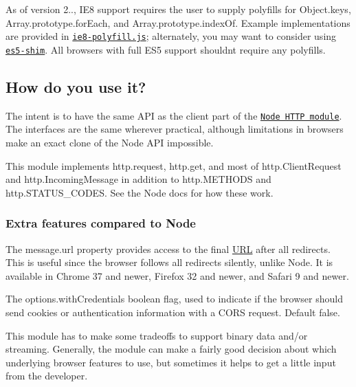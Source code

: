 As of version 2.., I\+E8 support requires the user to supply polyfills for {\ttfamily Object.\+keys}, {\ttfamily Array.\+prototype.\+for\+Each}, and {\ttfamily Array.\+prototype.\+index\+Of}. Example implementations are provided in \href{ie8-polyfill.js}{\tt ie8-\/polyfill.\+js}; alternately, you may want to consider using \href{https://github.com/es-shims/es5-shim}{\tt es5-\/shim}. All browsers with full E\+S5 support shouldn\textquotesingle{}t require any polyfills.

\subsection*{How do you use it?}

The intent is to have the same A\+PI as the client part of the \href{https://nodejs.org/api/http.html}{\tt Node H\+T\+TP module}. The interfaces are the same wherever practical, although limitations in browsers make an exact clone of the Node A\+PI impossible.

This module implements {\ttfamily http.\+request}, {\ttfamily http.\+get}, and most of {\ttfamily http.\+Client\+Request} and {\ttfamily http.\+Incoming\+Message} in addition to {\ttfamily http.\+M\+E\+T\+H\+O\+DS} and {\ttfamily http.\+S\+T\+A\+T\+U\+S\+\_\+\+C\+O\+D\+ES}. See the Node docs for how these work.

\subsubsection*{Extra features compared to Node}


\begin{DoxyItemize}
\item The {\ttfamily message.\+url} property provides access to the final \mbox{\hyperlink{namespace_u_r_l}{U\+RL}} after all redirects. This is useful since the browser follows all redirects silently, unlike Node. It is available in Chrome 37 and newer, Firefox 32 and newer, and Safari 9 and newer.
\item The {\ttfamily options.\+with\+Credentials} boolean flag, used to indicate if the browser should send cookies or authentication information with a C\+O\+RS request. Default false.
\end{DoxyItemize}

This module has to make some tradeoffs to support binary data and/or streaming. Generally, the module can make a fairly good decision about which underlying browser features to use, but sometimes it helps to get a little input from the developer.


